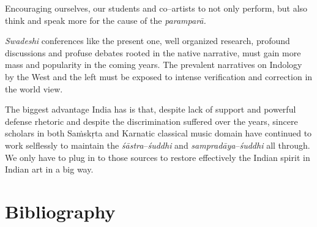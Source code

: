  \item Encouraging ourselves, our students and co–artists to not only perform, but also think and speak more for the cause of the \textit{paramparā.}

 \item \textit{Swadeshi} conferences like the present one, well organized research, profound discussions and profuse debates rooted in the native narrative, must gain more mass and popularity in the coming years. The prevalent narratives on Indology by the West and the left must be exposed to intense verification and correction in the world view.

The biggest advantage India has is that, despite lack of support and powerful defense rhetoric and despite the discrimination suffered over the years, sincere scholars in both Saṁskṛta and Karnatic classical music domain have continued to work selflessly to maintain the \textit{śāstra}–\textit{śuddhi} and \textit{sampradāya}–\textit{śuddhi} all through. We only have to plug in to those sources to restore effectively the Indian spirit in Indian art in a big way.


\section*{Bibliography}

